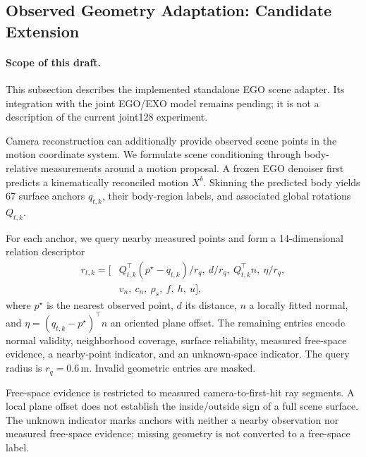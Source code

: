 \subsection{Observed Geometry Adaptation: Candidate Extension}
\label{sec:scene_candidate}

\paragraph{Scope of this draft.}
This subsection describes the implemented standalone EGO scene adapter. Its integration with the joint EGO/EXO model remains pending; it is not a description of the current joint128 experiment.

Camera reconstruction can additionally provide observed scene points in the motion coordinate system. We formulate scene conditioning through body-relative measurements around a motion proposal. A frozen EGO denoiser first predicts a kinematically reconciled motion $X^b$. Skinning the predicted body yields 67 surface anchors $q_{t,k}$, their body-region labels, and associated global rotations $Q_{t,k}$.

For each anchor, we query nearby measured points and form a 14-dimensional relation descriptor
\begin{equation}
\begin{aligned}
r_{t,k}=\big[&
Q_{t,k}^{\top}(p^\star-q_{t,k})/r_q,\
d/r_q,\
Q_{t,k}^{\top}n,\
\eta/r_q,\\
&v_n,\ c_n,\ \rho_s,\ f,\ h,\ u
\big],
\end{aligned}
\label{eq:scene_relations}
\end{equation}
where $p^\star$ is the nearest observed point, $d$ its distance, $n$ a locally fitted normal, and $\eta=(q_{t,k}-p^\star)^\top n$ an oriented plane offset. The remaining entries encode normal validity, neighborhood coverage, surface reliability, measured free-space evidence, a nearby-point indicator, and an unknown-space indicator. The query radius is $r_q=0.6\,\mathrm{m}$. Invalid geometric entries are masked.

Free-space evidence is restricted to measured camera-to-first-hit ray segments. A local plane offset does not establish the inside/outside sign of a full scene surface. The unknown indicator marks anchors with neither a nearby observation nor measured free-space evidence; missing geometry is not converted to a free-space label.

